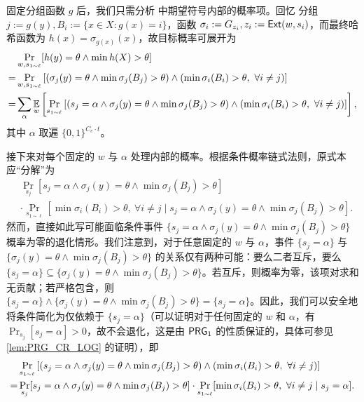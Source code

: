 固定分组函数 $g$ 后，我们只需分析  中期望符号内部的概率项。回忆 分组 $j := g(y), B_i := \{x \in X : g(x) = i\}$，函数 $\sigma_i := G_{z_i}, z_i := \mathsf{Ext}(w, s_i)$，而最终哈希函数为 $h(x) = \sigma_{g(x)}(x)$，故目标概率可展开为
\begin{align}
      & \Pr_{w, s_{1 \sim \ell}}[h(y) = \theta \wedge \min h(X) > \theta] \notag \\
    = & \Pr_{w, s_{1 \sim \ell}} \left[ (\sigma_j(y) = \theta \wedge \min \sigma_j(B_j) > \theta) \wedge (\min \sigma_i(B_i) > \theta,\ \forall i \ne j) \right] \notag \\
    = & \sum_\alpha \E_w\left[ \Pr_{s_{1 \sim \ell}}\left[ (s_j = \alpha \wedge \sigma_j(y) = \theta \wedge \min \sigma_j(B_j) > \theta) \wedge (\min \sigma_i(B_i) > \theta,\ \forall i \ne j) \right] \right], \label{eq:before_domain_reduction_1}
\end{align}
其中 $\alpha$ 取遍 $\{0, 1\}^{C_e \cdot t}$。

接下来对每个固定的 $w$ 与 $\alpha$ 处理内部的概率。根据条件概率链式法则，原式本应“分解”为
\begin{align*}
     & \Pr_{s_j}[s_j = \alpha \wedge \sigma_j(y) = \theta \wedge \min \sigma_j(B_j) > \theta] \\
     & \cdot \Pr_{s_{1 \sim \ell}}[ \min \sigma_i(B_i) > \theta,\ \forall i \ne j \mid s_j = \alpha \wedge \sigma_j(y) = \theta \wedge \min \sigma_j(B_j) > \theta].
\end{align*}
然而，直接如此写可能面临条件事件 $\{s_j = \alpha \wedge \sigma_j(y) = \theta \wedge \min \sigma_j(B_j) > \theta\}$ 概率为零的退化情形。我们注意到，对于任意固定的 $w$ 与 $\alpha$，事件 $\{s_j = \alpha\}$ 与 $\{\sigma_j(y) = \theta \wedge \min \sigma_j(B_j) > \theta\}$ 的关系仅有两种可能：要么二者互斥，要么 $\{s_j = \alpha\} \subseteq \{\sigma_j(y) = \theta \wedge \min \sigma_j(B_j) > \theta\}$。若互斥，则概率为零，该项对求和无贡献；若严格包含，则 $\{s_j = \alpha\} \wedge \{\sigma_j(y) = \theta \wedge \min \sigma_j(B_j) > \theta\} = \{s_j = \alpha\}$。因此，我们可以安全地将条件简化为仅依赖于 $\{s_j = \alpha\}$（可以证明对于任何固定的 $w$ 和 $\alpha$，有 $\Pr_{s_j}[s_j = \alpha] > 0$，故不会退化，这是由 $\mathsf{PRG}_1$ 的性质保证的，具体可参见 \cref{lem:PRG_CR_LOG} 的证明），即
\begin{align}
    & \Pr_{s_{1 \sim \ell}}\left[ (s_j = \alpha \wedge \sigma_j(y) = \theta \wedge \min \sigma_j(B_j) > \theta) \wedge (\min \sigma_i(B_i) > \theta,\ \forall i \ne j) \right] \notag \\
  = & \Pr_{s_j}[s_j = \alpha \wedge \sigma_j(y) = \theta \wedge \min \sigma_j(B_j) > \theta] \cdot \Pr_{s_{1 \sim \ell}}[ \min \sigma_i(B_i) > \theta,\ \forall i \ne j \mid s_j = \alpha ]. \label{eq:before_domain_reduction_2}
\end{align}

